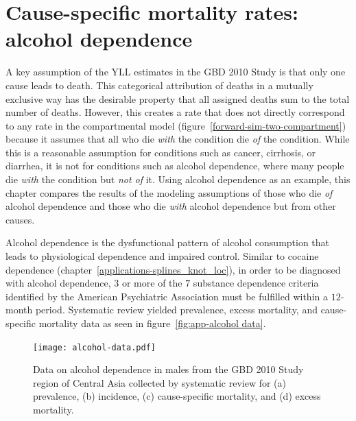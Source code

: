 \chapter{Cause-specific mortality rates: alcohol dependence}
\label{applications-csmr}

A key assumption of the YLL estimates in the GBD 2010 Study is that only
one cause leads to death.  This categorical attribution of deaths in
a mutually exclusive way has the desirable property that all assigned
deaths sum to the total number of deaths.  However, this
creates a rate that does not directly correspond to any rate in the
compartmental model (figure~\ref{forward-sim-two-compartment}) because it
assumes that all who die \emph{with} the condition die \emph{of} the
condition.  While this is a reasonable assumption for conditions
such as cancer, cirrhosis, or diarrhea, it is not for conditions such as
alcohol dependence, where many people die \emph{with}
the condition but \emph{not of} it.  Using alcohol dependence as an
example, this chapter compares the results of
the modeling assumptions of those who die \emph{of} alcohol dependence
and those who die \emph{with} alcohol dependence but from other causes.

Alcohol dependence is the dysfunctional pattern of alcohol consumption
that leads to physiological dependence and impaired control.  Similar to
cocaine dependence (chapter~\ref{applications-splines_knot_loc}), in order to
be diagnosed with alcohol dependence, $3$ or more of the $7$
substance dependence criteria identified by the American Psychiatric
Association must be
fulfilled within a $12$-month period.
\cite{american_psychiatric_association_diagnostic_2000, hasin_prevalence_2007}
Systematic review yielded prevalence, excess mortality, and
cause-specific mortality data as seen in figure~\ref{fig:app-alcohol
  data}.

    \begin{figure}[h]
        \begin{center}
            \texttt{[image: alcohol-data.pdf]}
            \caption[Systematic review data for alcohol dependence.]{Data on alcohol
              dependence in males from the GBD 2010 Study region of
              Central Asia collected by systematic review for (a) prevalence, (b) incidence, (c)
              cause-specific mortality, and (d) excess mortality.}
            \label{fig:app-alcohol data}
        \end{center}
    \end{figure}

